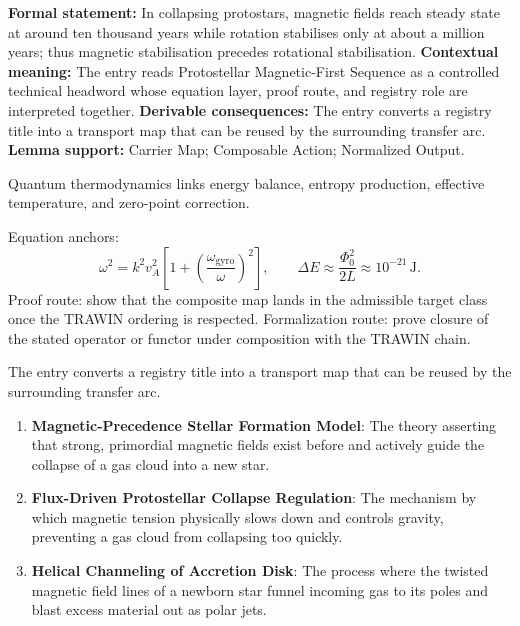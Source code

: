 \begingroup\footnotesize\setlength{\emergencystretch}{3em}\sloppy
\textbf{Formal statement:} In collapsing protostars, magnetic fields reach steady state at around ten thousand years while rotation stabilises only at about a million years; thus magnetic stabilisation precedes rotational stabilisation. \textbf{Contextual meaning:} The entry reads Protostellar Magnetic-First Sequence as a controlled technical headword whose equation layer, proof route, and registry role are interpreted together. \textbf{Derivable consequences:} The entry converts a registry title into a transport map that can be reused by the surrounding transfer arc. \textbf{Lemma support:} Carrier Map; Composable Action; Normalized Output.\par
\endgroup

Quantum thermodynamics links energy balance, entropy production, effective temperature, and zero-point correction.

Equation anchors:
\[
\omega^2=k^2v_A^2\left[1+\left(\frac{\omega_{\mathrm{gyro}}}{\omega}\right)^2\right],
\qquad
\Delta E\approx\frac{\Phi_0^2}{2L}\approx10^{-21}\,\mathrm{J}.
\]
Proof route: show that the composite map lands in the admissible target class once the TRAWIN ordering is respected. Formalization route: prove closure of the stated operator or functor under composition with the TRAWIN chain.

The entry converts a registry title into a transport map that can be reused by the surrounding transfer arc.
\endgroup

\begin{enumerate}[leftmargin=1.6em,itemsep=6pt,topsep=4pt]
\item \textbf{Magnetic-Precedence Stellar Formation Model}: The theory asserting that strong, primordial magnetic fields exist before and actively guide the collapse of a gas cloud into a new star.
\item \textbf{Flux-Driven Protostellar Collapse Regulation}: The mechanism by which magnetic tension physically slows down and controls gravity, preventing a gas cloud from collapsing too quickly.
\item \textbf{Helical Channeling of Accretion Disk}: The process where the twisted magnetic field lines of a newborn star funnel incoming gas to its poles and blast excess material out as polar jets.
\end{enumerate}

